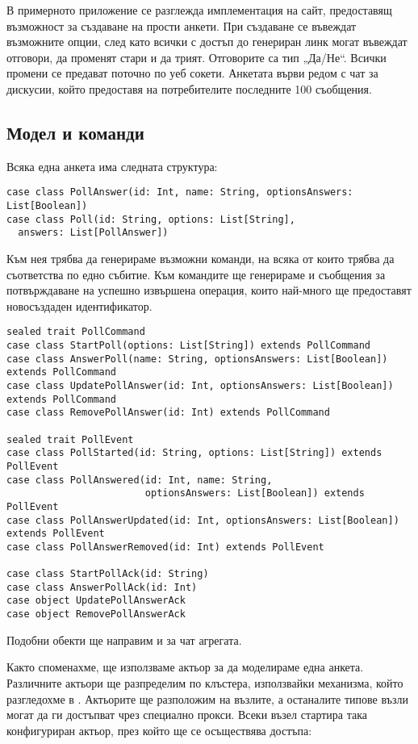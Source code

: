 В примерното приложение се разглежда имплементация на сайт, предоставящ възможност за създаване на прости анкети. При създаване се въвеждат възможните опции, след като всички с достъп до генериран линк могат въвеждат отговори, да променят стари и да трият. Отговорите са тип „Да/Не“. Всички промени се предават поточно по уеб сокети. Анкетата върви редом с чат за дискусии, който предоставя на потребителите последните 100 съобщения.

\subsection{Модел и команди}

Всяка една анкета има следната структура:

\begin{lstlisting}
case class PollAnswer(id: Int, name: String, optionsAnswers: List[Boolean])
case class Poll(id: String, options: List[String],
  answers: List[PollAnswer])
\end{lstlisting}

Към нея трябва да генерираме възможни команди, на всяка от които трябва да съответства по едно събитие. Към командите ще генерираме и съобщения за потвърждаване на успешно извършена операция, които най-много ще предоставят новосъздаден идентификатор.

\begin{lstlisting}
sealed trait PollCommand
case class StartPoll(options: List[String]) extends PollCommand
case class AnswerPoll(name: String, optionsAnswers: List[Boolean]) extends PollCommand
case class UpdatePollAnswer(id: Int, optionsAnswers: List[Boolean]) extends PollCommand
case class RemovePollAnswer(id: Int) extends PollCommand

sealed trait PollEvent
case class PollStarted(id: String, options: List[String]) extends PollEvent
case class PollAnswered(id: Int, name: String,
                        optionsAnswers: List[Boolean]) extends PollEvent
case class PollAnswerUpdated(id: Int, optionsAnswers: List[Boolean]) extends PollEvent
case class PollAnswerRemoved(id: Int) extends PollEvent

case class StartPollAck(id: String)
case class AnswerPollAck(id: Int)
case object UpdatePollAnswerAck
case object RemovePollAnswerAck
\end{lstlisting}

Подобни обекти ще направим и за чат агрегата.

Както споменахме, ще използваме актьор за да моделираме една анкета. Различните актьори ще разпределим по клъстера, използвайки механизма, който разгледохме в . Актьорите ще разположим на  възлите, а останалите типове възли могат да ги достъпват чрез специално прокси. Всеки  възел стартира така конфигуриран актьор, през който ще се осъществява достъпа:

